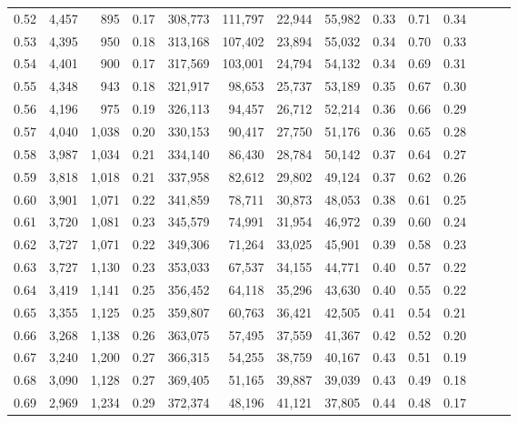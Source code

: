\begin{tabular}{rrrrrrrrrrrrrr}
0.52 &   4,457 &    895 &  0.17 &  308,773 &  111,797 &  22,944 &  55,982 &  0.33 &  0.71 &      0.34 \\
0.53 &   4,395 &    950 &  0.18 &  313,168 &  107,402 &  23,894 &  55,032 &  0.34 &  0.70 &      0.33 \\
0.54 &   4,401 &    900 &  0.17 &  317,569 &  103,001 &  24,794 &  54,132 &  0.34 &  0.69 &      0.31 \\
0.55 &   4,348 &    943 &  0.18 &  321,917 &   98,653 &  25,737 &  53,189 &  0.35 &  0.67 &      0.30 \\
0.56 &   4,196 &    975 &  0.19 &  326,113 &   94,457 &  26,712 &  52,214 &  0.36 &  0.66 &      0.29 \\
0.57 &   4,040 &  1,038 &  0.20 &  330,153 &   90,417 &  27,750 &  51,176 &  0.36 &  0.65 &      0.28 \\
0.58 &   3,987 &  1,034 &  0.21 &  334,140 &   86,430 &  28,784 &  50,142 &  0.37 &  0.64 &      0.27 \\
0.59 &   3,818 &  1,018 &  0.21 &  337,958 &   82,612 &  29,802 &  49,124 &  0.37 &  0.62 &      0.26 \\
0.60 &   3,901 &  1,071 &  0.22 &  341,859 &   78,711 &  30,873 &  48,053 &  0.38 &  0.61 &      0.25 \\
0.61 &   3,720 &  1,081 &  0.23 &  345,579 &   74,991 &  31,954 &  46,972 &  0.39 &  0.60 &      0.24 \\
0.62 &   3,727 &  1,071 &  0.22 &  349,306 &   71,264 &  33,025 &  45,901 &  0.39 &  0.58 &      0.23 \\
0.63 &   3,727 &  1,130 &  0.23 &  353,033 &   67,537 &  34,155 &  44,771 &  0.40 &  0.57 &      0.22 \\
0.64 &   3,419 &  1,141 &  0.25 &  356,452 &   64,118 &  35,296 &  43,630 &  0.40 &  0.55 &      0.22 \\
0.65 &   3,355 &  1,125 &  0.25 &  359,807 &   60,763 &  36,421 &  42,505 &  0.41 &  0.54 &      0.21 \\
0.66 &   3,268 &  1,138 &  0.26 &  363,075 &   57,495 &  37,559 &  41,367 &  0.42 &  0.52 &      0.20 \\
0.67 &   3,240 &  1,200 &  0.27 &  366,315 &   54,255 &  38,759 &  40,167 &  0.43 &  0.51 &      0.19 \\
0.68 &   3,090 &  1,128 &  0.27 &  369,405 &   51,165 &  39,887 &  39,039 &  0.43 &  0.49 &      0.18 \\
0.69 &   2,969 &  1,234 &  0.29 &  372,374 &   48,196 &  41,121 &  37,805 &  0.44 &  0.48 &      0.17 \\

\end{tabular}
